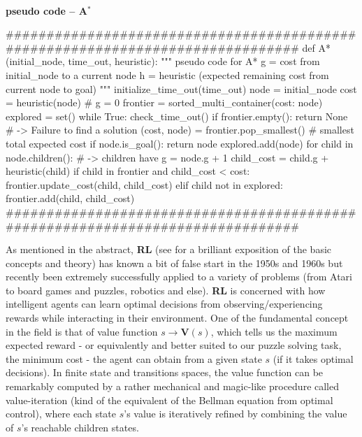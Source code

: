 \paragraph{}{\textbf{pseudo code -- A$^{*}$}}
\label{sec:TheoryAStar}
\begin{pseudocode}
###############################################################################
def A*(initial_node, time_out, heuristic):
    """ pseudo code for A*
    g = cost from initial_node to a current node
    h = heuristic (expected remaining cost from current node to goal)
    """
    initialize_time_out(time_out)
    node = initial_node
    cost = heuristic(node) # g = 0
    frontier = sorted_multi_container({cost: {node}})
    explored = set()
    while True:
        check_time_out()
        if frontier.empty():
            return None # -> Failure to find a solution
        (cost, node) = frontier.pop_smallest() # smallest total expected cost
        if node.is_goal():
            return node
        explored.add(node)
        for child in node.children(): # -> children have g = node.g + 1
            child_cost = child.g + heuristic(child)
            if child in frontier and child_cost < cost:
                frontier.update_cost(child, child_cost)
            elif child not in explored:
                frontier.add(child, child_cost)
###############################################################################
\end{pseudocode}
\black



\label{sec:RLTheory}

As mentioned in the abstract, \textbf{RL} (see \cite{Sutton1998} for a brilliant exposition of the basic concepts and theory) has known a bit of false start in the 1950s and 1960s but recently been extremely successfully applied to a variety of problems (from Atari to board games and puzzles, robotics and else). \textbf{RL} is concerned with how intelligent agents can learn optimal decisions from observing/experiencing rewards while interacting in their environment. One of the fundamental concept in the field is that of value function $s \to \textbf{V}(s)$, which tells us the maximum expected reward - or equivalently and better suited to our puzzle solving task, the minimum cost - the agent can obtain from a given state $s$ (if it takes optimal decisions). In finite state and transitions spaces, the value function can be remarkably computed by a rather mechanical and magic-like procedure called value-iteration (kind of the equivalent of the Bellman equation from optimal control), where each state $s$'s value is iteratively refined by combining the value of $s$'s reachable children states.
\teal
